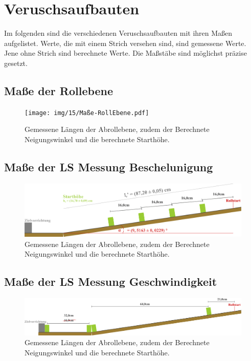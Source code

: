 \onecolumn
\chapter{Veruschsaufbauten}
Im folgenden sind die verschiedenen Veruschsaufbauten mit ihren Maßen aufgelistet. Werte, die mit einem Strich versehen sind, sind gemessene Werte. Jene ohne Strich sind berechnete Werte. Die Maßstäbe sind möglichst präzise gesetzt.

\section{Maße der Rollebene}
\begin{figure}[!ht]
    \centering
    \texttt{[image: img/15/Maße-RollEbene.pdf]}
    \caption{Gemessene Längen der Abrollebene, zudem der Berechnete Neigungswinkel und die berechnete Starthöhe.}
    \label{fig:maße_re}
\end{figure}

\section{Maße der LS Messung Beschelunigung}
\begin{figure}[!ht]
    \centering
    \includegraphics[width=1\textwidth]{img/15/Aufbau2.pdf}
    \caption{Gemessene Längen der Abrollebene, zudem der Berechnete Neigungswinkel und die berechnete Starthöhe.}
    \label{fig:maße_2}
\end{figure}

\section{Maße der LS Messung Geschwindigkeit}
\begin{figure}[!ht]
    \centering
    \includegraphics[width=1\textwidth]{img/15/Aufbau3.pdf}
    \caption{Gemessene Längen der Abrollebene, zudem der Berechnete Neigungswinkel und die berechnete Starthöhe.}
    \label{fig:maße_3}
\end{figure}
\twocolumn